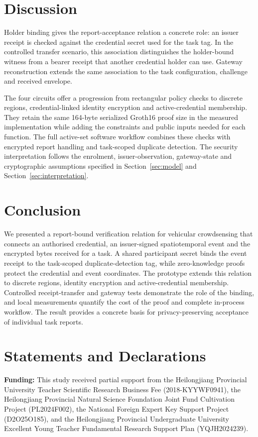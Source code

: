 \documentclass[pdflatex,iicol,sn-mathphys-num]{sn-jnl}
\begin{document}
\section{Discussion}
\label{sec:discussion}
Holder binding gives the report-acceptance relation a concrete role: an issuer receipt is checked against the credential secret used for the task tag. In the controlled transfer scenario, this association distinguishes the holder-bound witness from a bearer receipt that another credential holder can use. Gateway reconstruction extends the same association to the task configuration, challenge and received envelope.

The four circuits offer a progression from rectangular policy checks to discrete regions, credential-linked identity encryption and active-credential membership. They retain the same 164-byte serialized Groth16 proof size in the measured implementation while adding the constraints and public inputs needed for each function. The full active-set software workflow combines these checks with encrypted report handling and task-scoped duplicate detection. The security interpretation follows the enrolment, issuer-observation, gateway-state and cryptographic assumptions specified in Section~\ref{sec:model} and Section~\ref{sec:interpretation}.

\section{Conclusion}
We presented a report-bound verification relation for vehicular crowdsensing that connects an authorised credential, an issuer-signed spatiotemporal event and the encrypted bytes received for a task. A shared participant secret binds the event receipt to the task-scoped duplicate-detection tag, while zero-knowledge proofs protect the credential and event coordinates. The prototype extends this relation to discrete regions, identity encryption and active-credential membership. Controlled receipt-transfer and gateway tests demonstrate the role of the binding, and local measurements quantify the cost of the proof and complete in-process workflow. The result provides a concrete basis for privacy-preserving acceptance of individual task reports.



\section*{Statements and Declarations}
\noindent\textbf{Funding:} This study received partial support from the Heilongjiang Provincial University Teacher Scientific Research Business Fee (2018-KYYWF0941), the Heilongjiang Provincial Natural Science Foundation Joint Fund Cultivation Project (PL2024F002), the National Foreign Expert Key Support Project (D2O25O185), and the Heilongjiang Provincial Undergraduate University Excellent Young Teacher Fundamental Research Support Plan (YQJH2024239).
\end{document}
